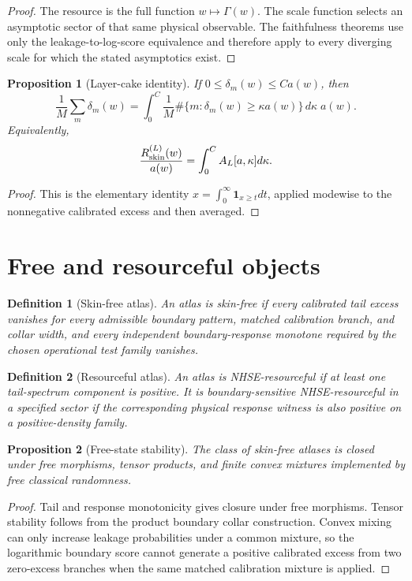 \documentclass[11pt]{article}
\newtheorem{definition}{Definition}
\newtheorem{proposition}{Proposition}
\newcommand{\Rskin}{R_{\rm skin}}
\begin{document}
\begin{proof}
The resource is the full function \(w\mapsto\Gamma(w)\). The scale function selects an asymptotic sector of that same physical observable. The faithfulness theorems use only the leakage-to-log-score equivalence and therefore apply to every diverging scale for which the stated asymptotics exist.
\end{proof}

\begin{proposition}[Layer-cake identity]
If \(0\le\delta_m(w)\le C a(w)\), then
\[
\frac{1}{M}\sum_m\delta_m(w)
=
\int_0^C
\frac1M\#\{m:\delta_m(w)\ge\kappa a(w)\}
\,d\kappa\; a(w).
\]
Equivalently,
\[
\frac{\Rskin^{(L)}(w)}{a(w)}
=
\int_0^C A_L[a,\kappa]d\kappa.
\]
\end{proposition}

\begin{proof}
This is the elementary identity \(x=\int_0^\infty\mathbf 1_{x\ge t}dt\), applied modewise to the nonnegative calibrated excess and then averaged.
\end{proof}

\section{Free and resourceful objects}

\begin{definition}[Skin-free atlas]
An atlas is skin-free if every calibrated tail excess vanishes for every admissible boundary pattern, matched calibration branch, and collar width, and every independent boundary-response monotone required by the chosen operational test family vanishes.
\end{definition}

\begin{definition}[Resourceful atlas]
An atlas is NHSE-resourceful if at least one tail-spectrum component is positive. It is boundary-sensitive NHSE-resourceful in a specified sector if the corresponding physical response witness is also positive on a positive-density family.
\end{definition}

\begin{proposition}[Free-state stability]
The class of skin-free atlases is closed under free morphisms, tensor products, and finite convex mixtures implemented by free classical randomness.
\end{proposition}

\begin{proof}
Tail and response monotonicity gives closure under free morphisms. Tensor stability follows from the product boundary collar construction. Convex mixing can only increase leakage probabilities under a common mixture, so the logarithmic boundary score cannot generate a positive calibrated excess from two zero-excess branches when the same matched calibration mixture is applied.
\end{proof}
\end{document}
